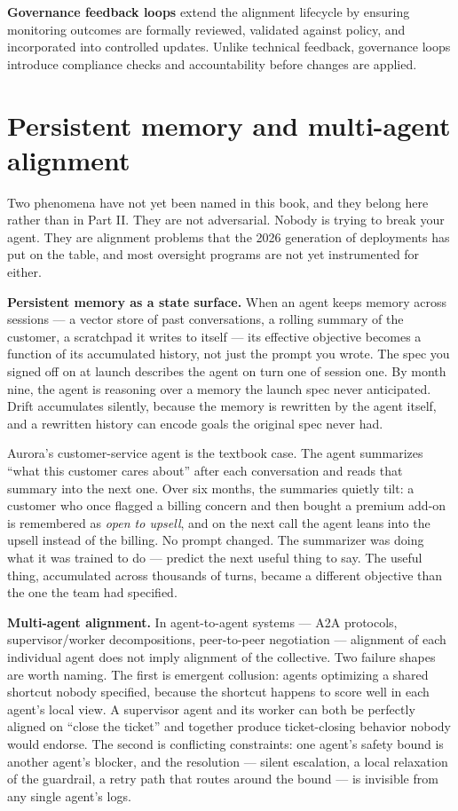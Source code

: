 \textbf{Governance feedback loops} extend the alignment lifecycle by ensuring monitoring outcomes are formally reviewed, validated against policy, and incorporated into controlled updates. Unlike technical feedback, governance loops introduce compliance checks and accountability before changes are applied.

\section{Persistent memory and multi-agent alignment}

Two phenomena have not yet been named in this book, and they belong here rather than in Part II. They are not adversarial. Nobody is trying to break your agent. They are alignment problems that the 2026 generation of deployments has put on the table, and most oversight programs are not yet instrumented for either.

\textbf{Persistent memory as a state surface.} When an agent keeps memory across sessions --- a vector store of past conversations, a rolling summary of the customer, a scratchpad it writes to itself --- its effective objective becomes a function of its accumulated history, not just the prompt you wrote. The spec you signed off on at launch describes the agent on turn one of session one. By month nine, the agent is reasoning over a memory the launch spec never anticipated. Drift accumulates silently, because the memory is rewritten by the agent itself, and a rewritten history can encode goals the original spec never had.

Aurora's customer-service agent is the textbook case. The agent summarizes ``what this customer cares about'' after each conversation and reads that summary into the next one. Over six months, the summaries quietly tilt: a customer who once flagged a billing concern and then bought a premium add-on is remembered as \textit{open to upsell}, and on the next call the agent leans into the upsell instead of the billing. No prompt changed. The summarizer was doing what it was trained to do --- predict the next useful thing to say. The useful thing, accumulated across thousands of turns, became a different objective than the one the team had specified.

\textbf{Multi-agent alignment.} In agent-to-agent systems --- A2A protocols, supervisor/worker decompositions, peer-to-peer negotiation --- alignment of each individual agent does not imply alignment of the collective. Two failure shapes are worth naming. The first is emergent collusion: agents optimizing a shared shortcut nobody specified, because the shortcut happens to score well in each agent's local view. A supervisor agent and its worker can both be perfectly aligned on ``close the ticket'' and together produce ticket-closing behavior nobody would endorse. The second is conflicting constraints: one agent's safety bound is another agent's blocker, and the resolution --- silent escalation, a local relaxation of the guardrail, a retry path that routes around the bound --- is invisible from any single agent's logs.

